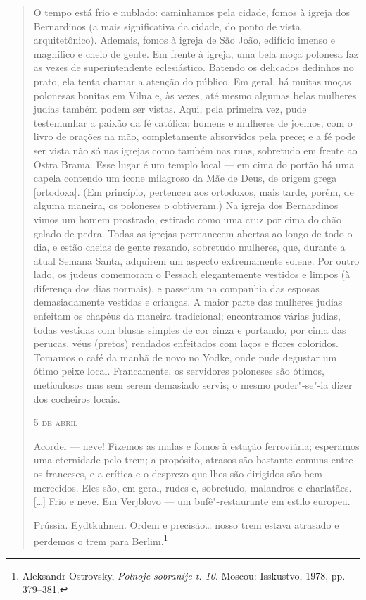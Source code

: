 \begin{quote}
O tempo está frio e nublado: caminhamos pela cidade, fomos à igreja dos
Bernardinos (a mais significativa da cidade, do ponto de vista
arquitetônico). Ademais, fomos à igreja de São João, edifício imenso e
magnífico e cheio de gente. Em frente à igreja, uma bela moça polonesa
faz as vezes de superintendente eclesiástico. Batendo os delicados
dedinhos no prato, ela tenta chamar a atenção do público. Em geral, há
muitas moças polonesas bonitas em Vilna e, às vezes, até mesmo algumas
belas mulheres judias também podem ser vistas. Aqui, pela primeira vez,
pude testemunhar a paixão da fé católica: homens e mulheres de joelhos,
com o livro de orações na mão, completamente absorvidos pela prece; e a
fé pode ser vista não só nas igrejas como também nas ruas, sobretudo em
frente ao Ostra Brama. Esse lugar é um templo local --- em cima do portão
há uma capela contendo um ícone milagroso da Mãe de Deus, de origem
grega {[}ortodoxa{]}. (Em princípio, pertenceu aos ortodoxos, mais
tarde, porém, de alguma maneira, os poloneses o obtiveram.) Na igreja
dos Bernardinos vimos um homem prostrado, estirado como uma cruz por
cima do chão gelado de pedra. Todas as igrejas permanecem abertas ao
longo de todo o dia, e estão cheias de gente rezando, sobretudo
mulheres, que, durante a atual Semana Santa, adquirem um aspecto
extremamente solene. Por outro lado, os judeus comemoram o Pessach
elegantemente vestidos e limpos (à diferença dos dias normais), e
passeiam na companhia das esposas demasiadamente vestidas e crianças. A
maior parte das mulheres judias enfeitam os chapéus da maneira
tradicional; encontramos várias judias, todas vestidas com blusas
simples de cor cinza e portando, por cima das perucas, véus (pretos)
rendados enfeitados com laços e flores coloridos. Tomamos o café da
manhã de novo no Yodke, onde pude degustar um ótimo peixe local.
Francamente, os servidores poloneses são ótimos, meticulosos mas sem
serem demasiado servis; o mesmo poder"-se"-ia dizer dos cocheiros locais.

\medskip
\begin{flushright}
\textsc{5 de abril}
\end{flushright}
\smallskip

Acordei --- neve! Fizemos as malas e fomos à estação ferroviária;
esperamos uma eternidade pelo trem; a propósito, atrasos são bastante
comuns entre os franceses, e a crítica e o desprezo que lhes são
dirigidos são bem merecidos. Eles são, em geral, rudes e, sobretudo,
malandros e charlatães. [\ldots{}] Frio e neve. Em Verjblovo --- um
bufê"-restaurante em estilo europeu.

Prússia. Eydtkuhnen. Ordem e precisão\ldots{} nosso trem estava
atrasado e perdemos o trem para Berlim.\footnote{Aleksandr Ostrovsky, \textit{Polnoje sobranije t. 10}. Moscou: Isskustvo, 1978, pp. 379--381.} 
\end{quote}

